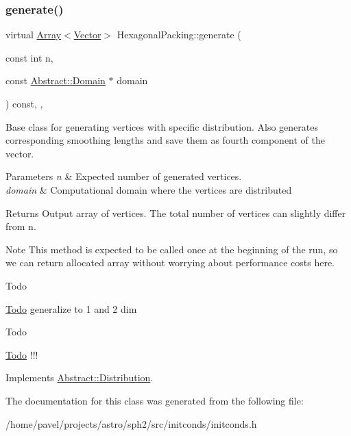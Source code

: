 \subsubsection{\texorpdfstring{generate()}{generate()}}
{\footnotesize\ttfamily virtual \hyperlink{classArray}{Array}$<$\hyperlink{classBasicVector}{Vector}$>$ Hexagonal\+Packing\+::generate (\begin{DoxyParamCaption}\item[{const int}]{n,  }\item[{const \hyperlink{classAbstract_1_1Domain}{Abstract\+::\+Domain} $\ast$}]{domain }\end{DoxyParamCaption}) const\hspace{0.3cm}{\ttfamily [inline]}, {\ttfamily [override]}, {\ttfamily [virtual]}}

Base class for generating vertices with specific distribution. Also generates corresponding smoothing lengths and save them as fourth component of the vector. 
\begin{DoxyParams}{Parameters}
{\em n} & Expected number of generated vertices. \\
\hline
{\em domain} & Computational domain where the vertices are distributed \\
\hline
\end{DoxyParams}
\begin{DoxyReturn}{Returns}
Output array of vertices. The total number of vertices can slightly differ from n. 
\end{DoxyReturn}
\begin{DoxyNote}{Note}
This method is expected to be called once at the beginning of the run, so we can return allocated array without worrying about performance costs here. 
\end{DoxyNote}
\begin{DoxyRefDesc}{Todo}
\item[\hyperlink{todo__todo000014}{Todo}]generalize to 1 and 2 dim \end{DoxyRefDesc}


\begin{DoxyRefDesc}{Todo}
\item[\hyperlink{todo__todo000015}{Todo}]!!! \end{DoxyRefDesc}


Implements \hyperlink{classAbstract_1_1Distribution_aefb835b4c4d2d0a5f864bc2cee0492b2}{Abstract\+::\+Distribution}.



The documentation for this class was generated from the following file\+:\begin{DoxyCompactItemize}
\item 
/home/pavel/projects/astro/sph2/src/initconds/initconds.\+h\end{DoxyCompactItemize}
